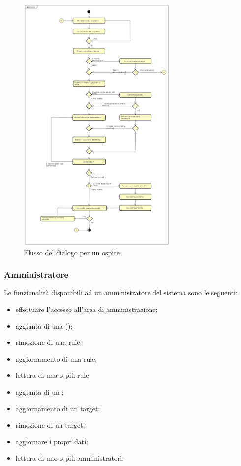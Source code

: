 \begin{figure}[h]\label{fig:flussoOspite}
	\centerline{\includegraphics[width=0.7\textwidth,height=\textheight,keepaspectratio]{sezioni/images/Utente.png}}
	\caption{Flusso del dialogo per un ospite}
\end{figure}
\newpage
\subsubsection{Amministratore}
Le funzionalità disponibili ad un amministratore del sistema sono le seguenti:
\begin{itemize}
	\item effettuare l'accesso all'area di amministrazione;
	\item aggiunta di una  ();
	\item rimozione di una rule;
	\item aggiornamento di una rule;
	\item lettura di una o più rule;
	\item aggiunta di un ;
	\item aggiornamento di un target;
	\item rimozione di un target;
	\item aggiornare i propri dati;
	\item lettura di uno o più amministratori.
\end{itemize}
